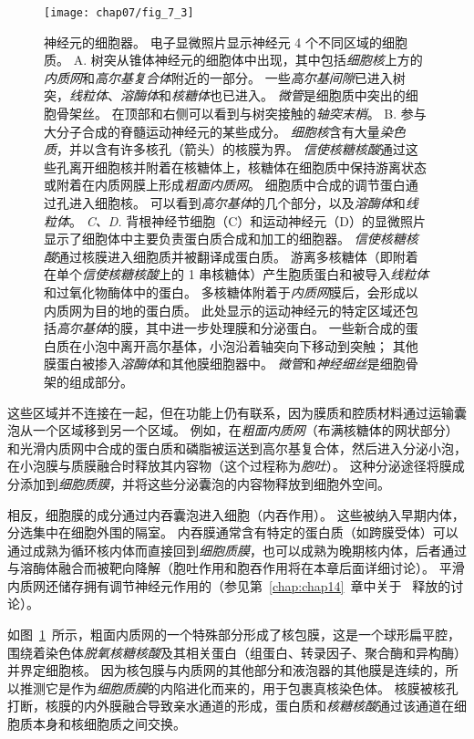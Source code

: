 \begin{figure}[htbp]
	\centering
	\texttt{[image: chap07/fig\_7\_3]}
	\caption{神经元的细胞器。
		电子显微照片显示神经元 4 个不同区域的细胞质\cite{peters1991neuropil}。
		A. 树突从锥体神经元的细胞体中出现，其中包括\textit{细胞核}上方的\textit{内质网}和\textit{高尔基复合体}附近的一部分。
		一些\textit{高尔基间隙}已进入树突，\textit{线粒体}、\textit{溶酶体}和\textit{核糖体}也已进入。
		\textit{微管}是细胞质中突出的细胞骨架丝。
		在顶部和右侧可以看到与树突接触的\textit{轴突末梢}。
		B. 参与大分子合成的脊髓运动神经元的某些成分。
		\textit{细胞核}含有大量\textit{染色质}，并以含有许多核孔（箭头）的核膜为界。
		\textit{信使核糖核酸}通过这些孔离开细胞核并附着在核糖体上，核糖体在细胞质中保持游离状态或附着在内质网膜上形成\textit{粗面内质网}。
		细胞质中合成的调节蛋白通过孔进入细胞核。
		可以看到\textit{高尔基体}的几个部分，以及\textit{溶酶体}和\textit{线粒体}。
		\textit{C、D.} 背根神经节细胞（C）和运动神经元（D）的显微照片显示了细胞体中主要负责蛋白质合成和加工的细胞器。
		\textit{信使核糖核酸}通过核膜进入细胞质并被翻译成蛋白质。
		游离多核糖体（即附着在单个\textit{信使核糖核酸}上的 1 串核糖体）产生胞质蛋白和被导入\textit{线粒体}和过氧化物酶体中的蛋白。
		多核糖体附着于\textit{内质网}膜后，会形成以内质网为目的地的蛋白质。
		此处显示的运动神经元的特定区域还包括\textit{高尔基体}的膜，其中进一步处理膜和分泌蛋白。
		一些新合成的蛋白质在小泡中离开高尔基体，小泡沿着轴突向下移动到突触；
		其他膜蛋白被掺入\textit{溶酶体}和其他膜细胞器中。
		\textit{微管}和\textit{神经细丝}是细胞骨架的组成部分。}
	\label{fig:7_3}
\end{figure}


这些区域并不连接在一起，但在功能上仍有联系，因为膜质和腔质材料通过运输囊泡从一个区域移到另一个区域。
例如，在\textit{粗面内质网}（布满核糖体的网状部分）和光滑内质网中合成的蛋白质和磷脂被运送到高尔基复合体，然后进入分泌小泡，在小泡膜与质膜融合时释放其内容物（这个过程称为\textit{胞吐}）。
这种分泌途径将膜成分添加到\textit{细胞质膜}，并将这些分泌囊泡的内容物释放到细胞外空间。


相反，细胞膜的成分通过内吞囊泡进入细胞（内吞作用）。
这些被纳入早期内体，分选集中在细胞外围的隔室。
内吞膜通常含有特定的蛋白质（如跨膜受体）可以通过成熟为循环核内体而直接回到\textit{细胞质膜}，也可以成熟为晚期核内体，后者通过与溶酶体融合而被靶向降解（胞吐作用和胞吞作用将在本章后面详细讨论）。
平滑内质网还储存拥有调节神经元作用的（参见第~\ref{chap:chap14}~章中关于~ 释放的讨论）。


如图~\ref{fig:7_3}~所示，粗面内质网的一个特殊部分形成了核包膜，这是一个球形扁平腔，围绕着染色体\textit{脱氧核糖核酸}及其相关蛋白（组蛋白、转录因子、聚合酶和异构酶）并界定细胞核。
因为核包膜与内质网的其他部分和液泡器的其他膜是连续的，所以推测它是作为\textit{细胞质膜}的内陷进化而来的，用于包裹真核染色体。
核膜被核孔打断，核膜的内外膜融合导致亲水通道的形成，蛋白质和\textit{核糖核酸}通过该通道在细胞质本身和核细胞质之间交换。


